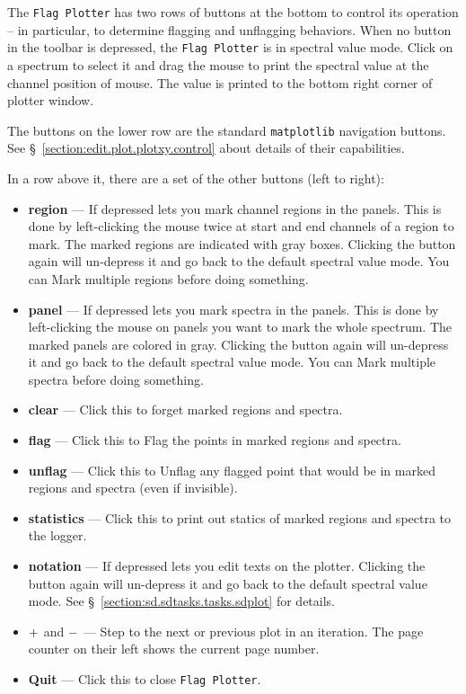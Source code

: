 The {\tt Flag Plotter} has two rows of buttons at the bottom to 
control its operation -- in particular, to determine flagging and 
unflagging behaviors. 
When no button in the toolbar is depressed, 
the {\tt Flag Plotter} is in spectral value mode. 
Click on a spectrum to select it and drag the mouse to print 
the spectral value at the channel position of mouse. The value is printed 
to the bottom right corner of plotter window.

The buttons on the lower row are the standard 
{\tt matplotlib} navigation buttons. 
See \S~\ref{section:edit.plot.plotxy.control} about details of their 
capabilities.

In a row above it, there are a set of the other buttons (left to right):
\begin{itemize}
\item {\bf region} --- If depressed lets you mark channel regions
  in the panels. This is done by left-clicking the mouse twice at start 
  and end channels of a region to mark. The marked regions are indicated 
  with gray boxes. Clicking the button again will un-depress it and go back 
  to the default spectral value mode.
  You can Mark multiple regions before doing something.
\item {\bf panel} --- If depressed lets you mark spectra in the panels.
  This is done by left-clicking the mouse on panels you want to mark the 
  whole spectrum. The marked panels are colored in gray.
  Clicking the button again will un-depress it and go back 
  to the default spectral value mode.
  You can Mark multiple spectra before doing something.
\item {\bf clear} --- Click this to forget marked regions and spectra.
\item {\bf flag} --- Click this to Flag the points in marked regions and spectra.
\item {\bf unflag} --- Click this to Unflag any flagged point that
  would be in marked regions and spectra (even if invisible).
\item {\bf statistics} --- Click this to print out statics of marked regions 
  and spectra to the logger.
\item {\bf notation} --- If depressed lets you edit texts on the plotter. 
  Clicking the button again will un-depress it and go back 
  to the default spectral value mode.
  See \S~\ref{section:sd.sdtasks.tasks.sdplot} for details.
\item $ {\bf +} $ and $ {\bf -} $ --- Step to the next or previous plot 
  in an iteration. The page counter on their left shows the current page
  number.
\item {\bf Quit} --- Click this to close {\tt Flag Plotter}.
\end {itemize}

